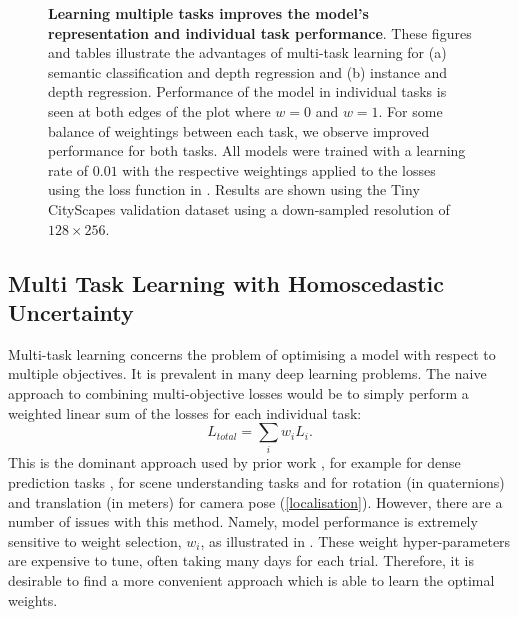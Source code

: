 {\begin{landscape}
\begin{figure}[t]
   \caption[Effect of loss weighting in multi-task learning.]{\textbf{Learning multiple tasks improves the model's representation and individual task performance}. These figures and tables illustrate the advantages of multi-task learning for (a) semantic classification and depth regression and (b) instance and depth regression. Performance of the model in individual tasks is seen at both edges of the plot where $w=0$ and $w=1$. For some balance of weightings between each task, we observe improved performance for both tasks. All models were trained with a learning rate of $0.01$ with the respective weightings applied to the losses using the loss function in . Results are shown using the Tiny CityScapes validation dataset using a down-sampled resolution of $128\times256$.}
\label{fig:scale_factor}
\end{figure}
\end{landscape}
\clearpage%
}


\subsection{Multi Task Learning with Homoscedastic Uncertainty}
\label{sec:multitask}

Multi-task learning concerns the problem of optimising a model with respect to multiple objectives. It is prevalent in many deep learning problems. The naive approach to combining multi-objective losses would be to simply perform a weighted linear sum of the losses for each individual task:
\begin{equation}
\label{eqn:basic_loss}
L_{total}= \sum_i w_i L_{i}.
\end{equation}
This is the dominant approach used by prior work \citep{teichmann2016multinet,sermanet2013overfeat,liao2016understand,uhrig2016pixel}, for example for dense prediction tasks \citep{kokkinos2016ubernet}, for scene understanding tasks \citep{eigen2015predicting} and for rotation (in quaternions) and translation (in meters) for camera pose (\cref{localisation}). However, there are a number of issues with this method. Namely, model performance is extremely sensitive to weight selection, $w_i$, as illustrated in . These weight hyper-parameters are expensive to tune, often taking many days for each trial. Therefore, it is desirable to find a more convenient approach which is able to learn the optimal weights.


